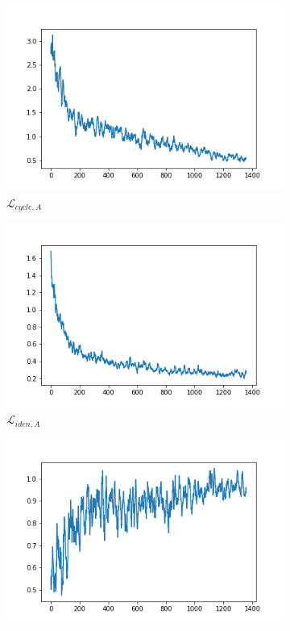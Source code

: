 \documentclass[twocolumn,11pt]{ctexart}
\begin{document}
\begin{figure}[htb]
\begin{subfigure}[b]{0.23\linewidth}
        \includegraphics[width=\linewidth]{exp4_cycle_A.png}
        \caption{$\mathcal{L}_{cycle,A}$}
      \end{subfigure}
      \begin{subfigure}[b]{0.23\linewidth}
        \includegraphics[width=\linewidth]{exp4_idt_A.png}
        \caption{$\mathcal{L}_{iden,A}$}
      \end{subfigure}
      \begin{subfigure}[b]{0.23\linewidth}
        \includegraphics[width=\linewidth]{exp4_G_B.png}

\end{subfigure}
\end{figure}
\end{document}
